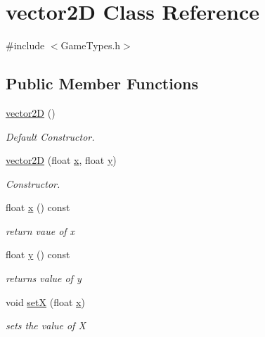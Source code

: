 \hypertarget{classvector2_d}{}\section{vector2D Class Reference}
\label{classvector2_d}


{\ttfamily \#include $<$Game\+Types.\+h$>$}

\subsection*{Public Member Functions}
\begin{DoxyCompactItemize}
\item 
\mbox{\label{classvector2_d_a40d097870590184a9d00b3e9d1eebe0c}} 
\mbox{\hyperlink{classvector2_d_a40d097870590184a9d00b3e9d1eebe0c}{vector2D}} ()
\begin{DoxyCompactList}\small\item\em Default Constructor. \end{DoxyCompactList}\item 
\mbox{\label{classvector2_d_a4fa73f0a917a252aa1e764f0f856dbbf}} 
\mbox{\hyperlink{classvector2_d_a4fa73f0a917a252aa1e764f0f856dbbf}{vector2D}} (float \mbox{\hyperlink{classvector2_d_a5a10d60e8f3329a93788aeee486afcb1}{x}}, float \mbox{\hyperlink{classvector2_d_abe3fccbcc8141dc83e7597fd4564380f}{y}})
\begin{DoxyCompactList}\small\item\em Constructor. \end{DoxyCompactList}\item 
float \mbox{\hyperlink{classvector2_d_a5a10d60e8f3329a93788aeee486afcb1}{x}} () const
\begin{DoxyCompactList}\small\item\em return vaue of x \end{DoxyCompactList}\item 
float \mbox{\hyperlink{classvector2_d_abe3fccbcc8141dc83e7597fd4564380f}{y}} () const
\begin{DoxyCompactList}\small\item\em returns value of y \end{DoxyCompactList}\item 
void \mbox{\hyperlink{classvector2_d_a721bdb863f691481d871751a8b1c30ff}{setX}} (float \mbox{\hyperlink{classvector2_d_a5a10d60e8f3329a93788aeee486afcb1}{x}})
\begin{DoxyCompactList}\small\item\em sets the value of X \end{DoxyCompactList}\item 

\end{DoxyCompactItemize}
